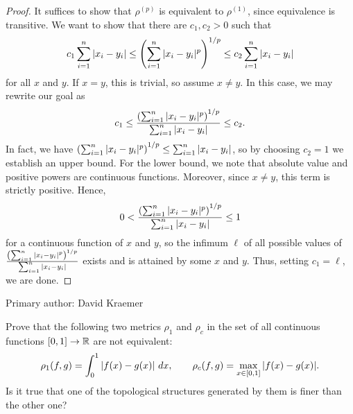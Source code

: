 \begin{proof}
    It suffices to show that $\rho^{(p)}$ is equivalent to $\rho^{(1)}$, since
    equivalence is transitive. We want to show that there are $c_1, c_2 > 0$
    such that
    \[
        c_1 \sum_{i=1}^{n}|x_i - y_i|\leq
        \left( \sum_{i=1}^{n}|x_i - y_i|^p \right)^{1/p} \leq
        c_2 \sum_{i=1}^{n}|x_i - y_i|
    \]
    for all $x$ and $y$. If $x = y$, this is trivial, so assume $x \ne y$. In
    this case, we may rewrite our goal as
    \[
        c_1 \leq 
        \frac{\left( \sum_{i=1}^{n}|x_i - y_i|^p \right)^{1/p}}
        {\sum_{i=1}^{n}|x_i - y_i|}
        \leq c_2.
    \]
    In fact, we have $\left( \sum_{i=1}^{n}|x_i - y_i|^p \right)^{1/p}\leq
    \sum_{i=1}^{n}|x_i - y_i|$, so by choosing $c_2 = 1$ we establish an upper
    bound. For the lower bound, we note that absolute value and positive
    powers are continuous functions. Moreover, since $x \ne y$, this term is
    strictly positive. Hence, 
    \[
        0 < \frac{\left( \sum_{i=1}^{n}|x_i - y_i|^p \right)^{1/p}}
        {\sum_{i=1}^{n}|x_i - y_i|}
        \leq 1
    \]
    for a continuous function of $x$ and $y$, so the infimum $\ell$ of all possible
    values of $\frac{\left( \sum_{i=1}^{n}|x_i - y_i|^p \right)^{1/p}}
        {\sum_{i=1}^{n}|x_i - y_i|}$ exists and is attained by some $x$ and
        $y$. Thus, setting $c_1 = \ell$, we are done.
\end{proof}

Primary author: David Kraemer

\begin{minorEx}
    Prove that the following two metrics $\rho_1$ and $\rho_c$ in the set of all
    continuous functions $[0,1] \to \mathbb{R}$ are not equivalent:
    \[
        \rho_1(f,g) = \int_{0}^{1} \abs{f(x) - g(x)} \ dx, \qquad
        \rho_c(f,g) = \max_{x \in [0,1]} \abs{f(x) - g(x)}.
    \]
    Is it true that one of the topological structures generated by them is finer
    than the other one?
\end{minorEx}

